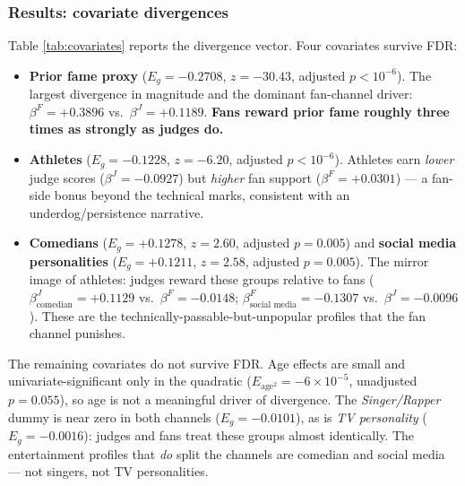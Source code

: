 \subsubsection{Results: covariate divergences}

Table \ref{tab:covariates} reports the divergence vector. Four covariates survive FDR:
\begin{itemize}
\item \textbf{Prior fame proxy} ($E_g = -0.2708$, $z = -30.43$, adjusted $p < 10^{-6}$).
The largest divergence in magnitude and the dominant fan-channel driver:
$\beta^F = +0.3896$ vs.\ $\beta^J = +0.1189$. \textbf{Fans reward prior fame roughly
three times as strongly as judges do.}
\item \textbf{Athletes} ($E_g = -0.1228$, $z = -6.20$, adjusted $p < 10^{-6}$).
Athletes earn \emph{lower} judge scores ($\beta^J = -0.0927$) but \emph{higher} fan
support ($\beta^F = +0.0301$) --- a fan-side bonus beyond the technical marks,
consistent with an underdog/persistence narrative.
\item \textbf{Comedians} ($E_g = +0.1278$, $z = 2.60$, adjusted $p = 0.005$) and
\textbf{social media personalities} ($E_g = +0.1211$, $z = 2.58$, adjusted $p = 0.005$).
The mirror image of athletes: judges reward these groups relative to fans
($\beta^J_{\text{comedian}} = +0.1129$ vs.\ $\beta^F = -0.0148$;
$\beta^F_{\text{social media}} = -0.1307$ vs.\ $\beta^J = -0.0096$). These are the
technically-passable-but-unpopular profiles that the fan channel punishes.
\end{itemize}

The remaining covariates do not survive FDR. Age effects are small and
univariate-significant only in the quadratic ($E_{\text{age}^2} = -6\times10^{-5}$,
unadjusted $p = 0.055$), so age is not a meaningful driver of divergence. The
\emph{Singer/Rapper} dummy is near zero in both channels ($E_g = -0.0101$), as is
\emph{TV personality} ($E_g = -0.0016$): judges and fans treat these groups almost
identically. The entertainment profiles that \emph{do} split the channels are comedian
and social media --- not singers, not TV personalities.


